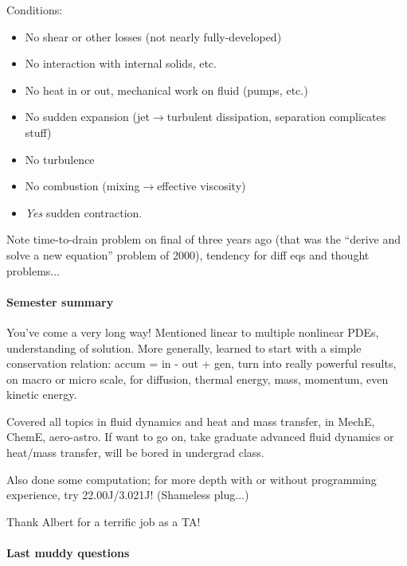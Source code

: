 \documentclass{report}
\begin{document}
Conditions:
\begin{itemize}
\item No shear or other losses (not nearly fully-developed)
\item No interaction with internal solids, etc.
\item No heat in or out, mechanical work on fluid (pumps, etc.)
\item No sudden expansion (jet$\longrightarrow$turbulent dissipation,
  separation complicates stuff)
\item No turbulence
\item No combustion (mixing$\longrightarrow$effective viscosity)
\item {\em Yes} sudden contraction.
\end{itemize}

Note time-to-drain problem on final of three years ago (that was the ``derive
and solve a new equation'' problem of 2000), tendency for diff eqs and thought
problems...

\paragraph{Semester summary}

You've come a very long way!  Mentioned linear to multiple nonlinear
PDEs, understanding of solution.  More generally, learned to start with a
simple conservation relation: accum = in - out + gen, turn into really powerful
results, on macro or micro scale, for diffusion, thermal energy, mass,
momentum, even kinetic energy.

Covered all topics in fluid dynamics and heat and mass transfer, in MechE,
ChemE, aero-astro.  If want to go on, take graduate advanced fluid dynamics or
heat/mass transfer, will be bored in undergrad class.

Also done some computation; for more depth with or without programming
experience, try 22.00J/3.021J!  (Shameless plug...)

Thank Albert for a terrific job as a TA!

\paragraph{Last muddy questions}
\end{document}
